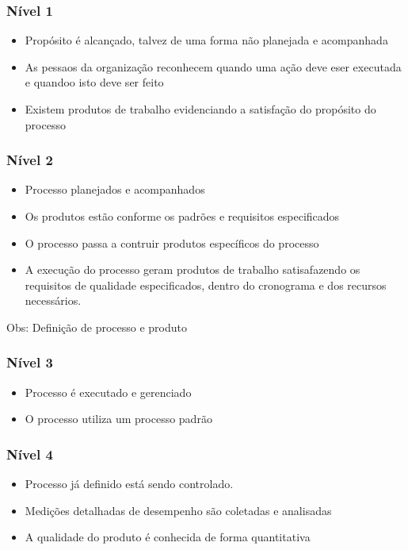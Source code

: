 \documentclass{article}
\begin{document}
	\subsubsection{Nível 1}
		\begin{itemize}
		

		\item Propósito é alcançado, talvez de uma forma não planejada e acompanhada
		\item As pessaos da organização reconhecem quando uma ação deve eser executada e quandoo isto deve ser feito
		\item Existem produtos de trabalho evidenciando a satisfação do propósito do processo		
		\end{itemize}		

	\subsubsection{Nível 2}
		\begin{itemize}
		\item Processo planejados e acompanhados
		\item Os produtos estão conforme os padrões e requisitos especificados
		\item O processo passa a contruir produtos específicos do processo
		\item A execução do processo geram produtos de trabalho satisafazendo os requisitos de qualidade especificados, dentro do cronograma e dos recursos necessários.
		
		\end{itemize}
		
		Obs: Definição de processo e produto
	\subsubsection{Nível 3}
		\begin{itemize}
		\item Processo é executado e gerenciado
		\item O processo utiliza um processo padrão
		
		\end{itemize}
	
	\subsubsection{Nível 4}
		\begin{itemize}
		\item Processo já definido está sendo controlado.
		\item Medições detalhadas de desempenho são coletadas e analisadas
		\item A qualidade do produto é conhecida de forma quantitativa
		
		\end{itemize}
	
\end{document}
